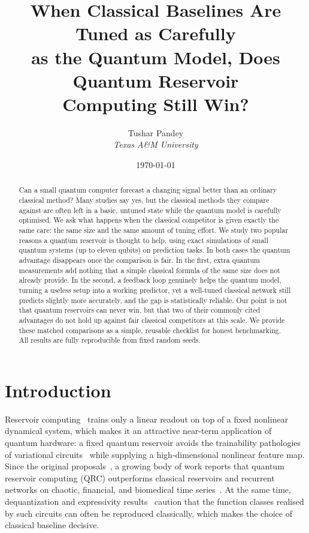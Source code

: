 \documentclass[11pt,a4paper]{article}
\title{When Classical Baselines Are Tuned as Carefully\\
as the Quantum Model, Does Quantum Reservoir\\
Computing Still Win?}
\author{
    Tushar Pandey\\
    \textit{Texas A\&M University}
}
\date{\today}
\begin{document}
\maketitle

\begin{abstract}
Can a small quantum computer forecast a changing signal better than an ordinary
classical method? Many studies say yes, but the classical methods they compare
against are often left in a basic, untuned state while the quantum model is
carefully optimised. We ask what happens when the classical competitor is given
exactly the same care: the same size and the same amount of tuning effort. We
study two popular reasons a quantum reservoir is thought to help, using exact
simulations of small quantum systems (up to eleven qubits) on prediction tasks.
In both cases the quantum advantage disappears once the comparison is fair. In
the first, extra quantum measurements add nothing that a simple classical formula
of the same size does not already provide. In the second, a feedback loop genuinely
helps the quantum model, turning a useless setup into a working predictor, yet a
well-tuned classical network still predicts slightly more accurately, and the gap
is statistically reliable. Our point is not that quantum reservoirs can never win,
but that two of their commonly cited advantages do not hold up against fair
classical competitors at this scale. We provide these matched comparisons as a
simple, reusable checklist for honest benchmarking. All results are fully
reproducible from fixed random seeds.
\end{abstract}

\section{Introduction}

Reservoir computing~\cite{jaeger2001,maass2002} trains only a linear readout on
top of a fixed nonlinear dynamical system, which makes it an attractive
near-term application of quantum hardware: a fixed quantum reservoir avoids the
trainability pathologies of variational circuits~\cite{mcclean2018} while
supplying a high-dimensional nonlinear feature map. Since the original
proposals~\cite{fujii2017,nakajima2019}, a growing body of work reports that
quantum reservoir computing (QRC) outperforms classical reservoirs and recurrent
networks on chaotic, financial, and biomedical time
series~\cite{mujal2021,martinezpena2021}. At the same time, dequantization and
expressivity results~\cite{schuld2021,sweke2021} caution that the function
classes realised by such circuits can often be reproduced classically, which
makes the choice of classical baseline decisive.
\end{document}
